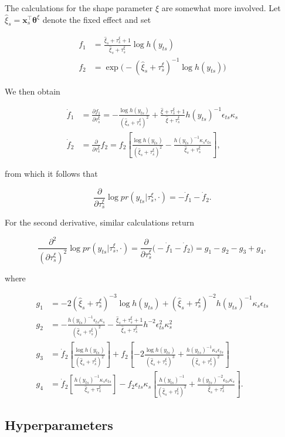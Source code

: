 \documentclass[11pt,english]{article}
\newcommand{\bs}[1]{\boldsymbol{#1}}
\newcommand{\pderiv}[2]{\frac{\partial #1}{\partial #2}}
\newcommand{\pderivsq}[1]{\frac{\partial^2}{(\partial #1)^2}}
\newcommand{\bl}{\begin{linenomath}}
\newcommand{\el}{\end{linenomath}}
\begin{document}
The calculations for the shape parameter $\xi$ are somewhat more involved. Let $\hat{\xi}_s = \bs{x}_s^\top \bs{\theta}^\xi$ denote the fixed effect and set 
\bl\begin{align*}
f_1 &= \frac{\hat{\xi}_s + \tau_s^{\xi} + 1}{\hat{\xi}_s + \tau_s^{\xi}}\log h(y_{ts})\\
f_2 &= \exp\Big(-(\hat{\xi}_s + \tau_s^\xi)^{-1} \log h(y_{ts})\Big)
\end{align*}\el
We then obtain 
\bl\begin{align*}
\dot{f}_1 & = \pderiv{f_1}{\tau_s^{\xi}} = -\frac{\log h(y_{ts})}{(\hat{\xi}_s + \tau_s^{\xi})^2} + \frac{\hat{\xi} + \tau_s^{\xi} + 1}{\hat{\xi} + \tau_s^{\xi}}h(y_{ts})^{-1}\epsilon_{ts}\kappa_s\\
\dot{f}_2 & = \pderiv{}{\tau_s^\xi}f_2 = f_2  \left[\frac{\log h(y_{ts})}{(\hat{\xi}_s + \tau_s^\xi)^{2}} - \frac{h(y_{ts})^{-1}\kappa_s\epsilon_{ts}}{\hat{\xi}_s + \tau_s^{\xi}}\right],
\end{align*}\el
from which it follows that 
\bl\[
\pderiv{}{\tau_s^\xi} \log pr(y_{ts}| \tau_s^\xi, \cdot) = -\dot{f}_1 - \dot{f}_2.
\]\el
For the second derivative, similar calculations return
\bl\[
\pderivsq{\tau_s^\xi} \log pr(y_{ts}|\tau_s^\xi, \cdot) = \pderiv{}{\tau_s^{\xi}} \big(-\dot{f}_1 - \dot{f}_2\big) = g_1 - g_2 - g_3 + g_4,
\]\el
where
\bl\begin{align*}
g_1 &= -2(\hat{\xi}_s + \tau_s^{\xi})^{-3}\log h(y_{ts}) + (\hat{\xi}_s + \tau_s^\xi)^{-2}h(y_{ts})^{-1} \kappa_s\epsilon_{ts}\\
g_2 &= -\frac{h(y_{ts})^{-1}\epsilon_{ts}\kappa_s}{(\hat{\xi}_s + \tau_s^\xi)^2} - \frac{\hat{\xi}_s +\tau_s^\xi + 1}{\hat{\xi}_s + \tau_s^\xi}h^{-2}\epsilon_{ts}^2\kappa_s^2 \\
g_3&= \dot{f}_2\left[\frac{\log h(y_{ts})}{(\hat{\xi}_s + \tau_s^\xi)^{2}}\right] + f_2 \left[-2\frac{\log h(y_{ts})}{(\hat{\xi}_s + \tau_s^\xi)^{3}} + \frac{h(y_{ts})^{-1}\kappa_s\epsilon_{ts}}{(\hat{\xi}_s + \tau_s^\xi)^{2}}\right]\\
g_4 &= \dot{f}_2\left[\frac{h(y_{ts})^{-1}\kappa_s\epsilon_{ts}}{\hat{\xi}_s + \tau_s^{\xi}}\right] - f_2 \epsilon_{ts}\kappa_s\left[\frac{h(y_{ts})^{-1}}{(\hat{\xi}_s + \tau_s^{\xi})^{2}} + \frac{h(y_{ts})^{-2}\epsilon_{ts}\kappa_s}{\hat{\xi}_s + \tau_s^\xi}\right]. 
\end{align*}\el

\subsection{Hyperparameters}
\end{document}
